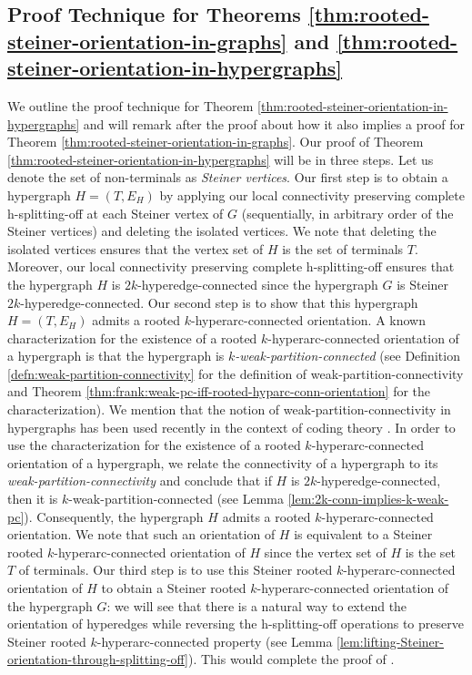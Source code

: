 \subsection{Proof Technique for Theorems \ref{thm:rooted-steiner-orientation-in-graphs} and \ref{thm:rooted-steiner-orientation-in-hypergraphs}}
We outline the proof technique for Theorem \ref{thm:rooted-steiner-orientation-in-hypergraphs} and will remark after the proof about how it also implies a proof for Theorem \ref{thm:rooted-steiner-orientation-in-graphs}. 
Our proof of Theorem \ref{thm:rooted-steiner-orientation-in-hypergraphs} will be in three steps. 
Let us denote the set of non-terminals as \emph{Steiner vertices}. 
Our first step is to obtain a hypergraph $H = (T, E_H)$ by applying our local connectivity preserving complete h-splitting-off at each Steiner vertex of $G$ (sequentially, in arbitrary order of the Steiner vertices) and deleting the isolated  vertices. 
We note that deleting the isolated vertices ensures that the vertex set of $H$ is the set of terminals $T$. 
Moreover, our local connectivity preserving complete h-splitting-off ensures that the hypergraph $H$ is $2k$-hyperedge-connected since the hypergraph $G$ is Steiner $2k$-hyperedge-connected. 
Our second step is to show that this hypergraph $H=(T, E_H)$ admits a rooted $k$-hyperarc-connected orientation. 
A known characterization for the existence of a rooted $k$-hyperarc-connected orientation of a hypergraph is that the hypergraph is \emph{$k$-weak-partition-connected} (see Definition \ref{defn:weak-partition-connectivity} for the definition of weak-partition-connectivity and Theorem \ref{thm:frank:weak-pc-iff-rooted-hyparc-conn-orientation} for the characterization). We mention that the notion of weak-partition-connectivity in hypergraphs has been used recently in the  context of coding theory \cite{GLSTW22, AGL23}. 
In order to use the characterization for the existence of a rooted $k$-hyperarc-connected orientation of a hypergraph, we relate the connectivity of a hypergraph to its \emph{weak-partition-connectivity} and conclude that if $H$ is $2k$-hyperedge-connected, then it is $k$-weak-partition-connected (see Lemma \ref{lem:2k-conn-implies-k-weak-pc}). 
Consequently, the hypergraph $H$ admits a rooted $k$-hyperarc-connected orientation. 
We note that such an orientation of $H$ is equivalent to a Steiner rooted $k$-hyperarc-connected orientation of $H$ since the vertex set of $H$ is the set $T$ of terminals. 
Our third step is to use this Steiner rooted $k$-hyperarc-connected orientation of $H$ to obtain a Steiner rooted $k$-hyperarc-connected orientation of the hypergraph $G$: we will see that there is a natural way to extend the orientation of hyperedges while reversing the h-splitting-off operations to preserve Steiner rooted $k$-hyperarc-connected property (see Lemma \ref{lem:lifting-Steiner-orientation-through-splitting-off}). This would complete the proof of . 

